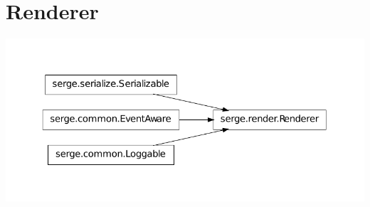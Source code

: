 \documentclass[letterpaper,10pt,english]{sphinxmanual}
\begin{document}
\section{Renderer}
\label{renderering:renderer}
\includegraphics{inheritance-e5a968b60b65c1dac656cd99239cc226c7d7d9f1.pdf}
\end{document}
